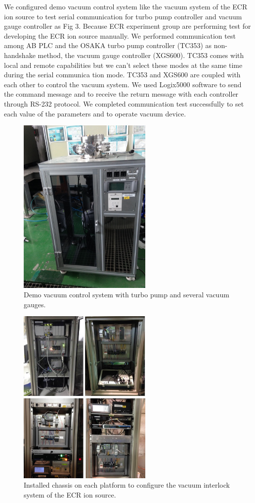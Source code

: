 \documentclass[a4paper,
              ]{jacow}
\begin{document}
We configured demo vacuum control system like the vacuum system of the ECR ion source to test serial communication for turbo pump controller and vacuum gauge controller as Fig 3. Because ECR experiment group are performing test for developing the ECR ion source manually. 
We performed communication test among AB PLC and the OSAKA turbo pump controller (TC353) as non-handshake method, the vacuum gauge controller (XGS600). TC353 comes with local and remote capabilities but we can’t select these modes at the same time during the serial communica tion mode. TC353 and XGS600 are coupled with each other to control the vacuum system. We used Logix5000 software to send the command message and to receive the return message with each controller through RS-232 protocol. We completed communication test successfully to set each value of the parameters and to operate vacuum device.  

\begin{figure}[!htb]
   \centering
   \includegraphics*[width=65mm]{MOPGF119f3}
   \caption{Demo vacuum control system with turbo pump and several vacuum gauges.}
   \label{l2ea4-f1}
\end{figure}

\begin{figure}[!htb]
	\centering
	\includegraphics*[width=65mm]{MOPGF119f4}
	\caption{Installed chassis on each platform to configure the vacuum interlock system of the ECR ion source.}
	\label{l2ea4-f1}
\end{figure}
\end{document}
